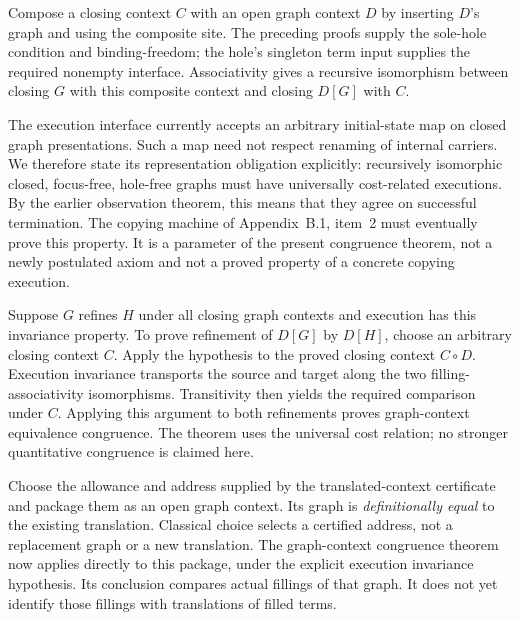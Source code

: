 Compose a closing context $C$ with an open graph context $D$ by inserting
$D$'s graph and using the composite site. The preceding proofs supply the
sole-hole condition and binding-freedom; the hole's singleton term input
supplies the required nonempty interface. Associativity gives a recursive
isomorphism between closing $G$ with this composite context and closing
$D[G]$ with $C$.









The execution interface currently accepts an arbitrary initial-state map
on closed graph presentations. Such a map need not respect renaming of
internal carriers. We therefore state its representation obligation
explicitly: recursively isomorphic closed, focus-free, hole-free graphs
must have universally cost-related executions. By the earlier observation
theorem, this means that they agree on successful termination. The copying
machine of Appendix~B.1, item~2 must eventually prove this property. It is
a parameter of the present congruence theorem, not a newly postulated axiom
and not a proved property of a concrete copying execution.

Suppose $G$ refines $H$ under all closing graph contexts and execution has
this invariance property. To prove refinement of $D[G]$ by $D[H]$, choose
an arbitrary closing context $C$. Apply the hypothesis to the proved
closing context $C\circ D$. Execution invariance transports the source
and target along the two filling-associativity isomorphisms. Transitivity
then yields the required comparison under $C$. Applying this argument to
both refinements proves graph-context equivalence congruence. The theorem
uses the universal cost relation; no stronger quantitative congruence is
claimed here.







Choose the allowance and address supplied by the translated-context
certificate and package them as an open graph context. Its graph is
\emph{definitionally equal} to the existing translation. Classical choice
selects a certified address, not a replacement graph or a new translation.
The graph-context congruence theorem now applies directly to this package,
under the explicit execution invariance hypothesis. Its conclusion compares
actual fillings of that graph. It does not yet identify those fillings
with translations of filled terms.


